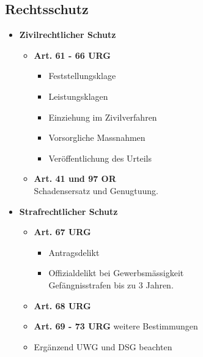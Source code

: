 \subsection{Rechtsschutz}

\begin{itemize}
	\item \textbf{Zivilrechtlicher Schutz}
	\begin{itemize}
		\item \textbf{Art. 61 - 66 URG}
		\begin{itemize}
			\item Feststellungsklage
			\item Leistungsklagen
			\item Einziehung im Zivilverfahren
			\item Vorsorgliche Massnahmen
			\item Veröffentlichung des Urteils
		\end{itemize}
		\item \textbf{Art. 41 und 97 OR}\\
		Schadensersatz und Genugtuung.
	\end{itemize}
	\item \textbf{Strafrechtlicher Schutz}
	\begin{itemize}
		\item \textbf{Art. 67 URG}
		\begin{itemize}
			\item Antragsdelikt
			\item Offizialdelikt bei Gewerbsmässigkeit\\
			Gefängnisstrafen bis zu 3 Jahren.
		\end{itemize}
		\item \textbf{Art. 68 URG}
		\item \textbf{Art. 69 - 73 URG} weitere Bestimmungen
		\item Ergänzend UWG und DSG beachten
	\end{itemize}
\end{itemize}

